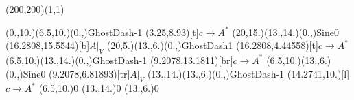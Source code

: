 \unitlength=1bp%

\begin{feynartspicture}(200,200)(1,1)

\FADiagram{}
\FAProp(0.,10.)(6.5,10.)(0.,){GhostDash}{-1}
\FALabel(3.25,8.93)[t]{$c\to A^*$}
\FAProp(20,15.)(13.,14.)(0.,){Sine}{0}
\FALabel(16.2808,15.5544)[b]{$A|_V$}
\FAProp(20,5.)(13.,6.)(0.,){GhostDash}{1}
\FALabel(16.2808,4.44558)[t]{$c\to A^*$}
\FAProp(6.5,10.)(13.,14.)(0.,){GhostDash}{-1}
\FALabel(9.2078,13.1811)[br]{$c\to A^*$}
\FAProp(6.5,10.)(13.,6.)(0.,){Sine}{0}
\FALabel(9.2078,6.81893)[tr]{$A|_V$}
\FAProp(13.,14.)(13.,6.)(0.,){GhostDash}{-1}
\FALabel(14.2741,10.)[l]{$c\to A^*$}
\FAVert(6.5,10.){0}
\FAVert(13.,14.){0}
\FAVert(13.,6.){0}
\end{feynartspicture}

